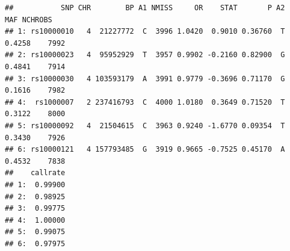 \documentclass[
]{book}
\newenvironment{Shaded}{\begin{snugshade}}{\end{snugshade}}
\newcommand{\AttributeTok}[1]{\textcolor[rgb]{0.77,0.63,0.00}{#1}}
\newcommand{\CommentTok}[1]{\textcolor[rgb]{0.56,0.35,0.01}{\textit{#1}}}
\newcommand{\ConstantTok}[1]{\textcolor[rgb]{0.00,0.00,0.00}{#1}}
\newcommand{\FunctionTok}[1]{\textcolor[rgb]{0.00,0.00,0.00}{#1}}
\newcommand{\NormalTok}[1]{#1}
\newcommand{\OtherTok}[1]{\textcolor[rgb]{0.56,0.35,0.01}{#1}}
\newcommand{\SpecialCharTok}[1]{\textcolor[rgb]{0.00,0.00,0.00}{#1}}
\newcommand{\StringTok}[1]{\textcolor[rgb]{0.31,0.60,0.02}{#1}}
\begin{document}
\begin{Shaded}
\end{Shaded}

\begin{verbatim}
##           SNP CHR        BP A1 NMISS     OR    STAT       P A2    MAF NCHROBS
## 1: rs10000010   4  21227772  C  3996 1.0420  0.9010 0.36760  T 0.4258    7992
## 2: rs10000023   4  95952929  T  3957 0.9902 -0.2160 0.82900  G 0.4841    7914
## 3: rs10000030   4 103593179  A  3991 0.9779 -0.3696 0.71170  G 0.1616    7982
## 4:  rs1000007   2 237416793  C  4000 1.0180  0.3649 0.71520  T 0.3122    8000
## 5: rs10000092   4  21504615  C  3963 0.9240 -1.6770 0.09354  T 0.3430    7926
## 6: rs10000121   4 157793485  G  3919 0.9665 -0.7525 0.45170  A 0.4532    7838
##    callrate
## 1:  0.99900
## 2:  0.98925
## 3:  0.99775
## 4:  1.00000
## 5:  0.99075
## 6:  0.97975
\end{verbatim}
\end{document}
